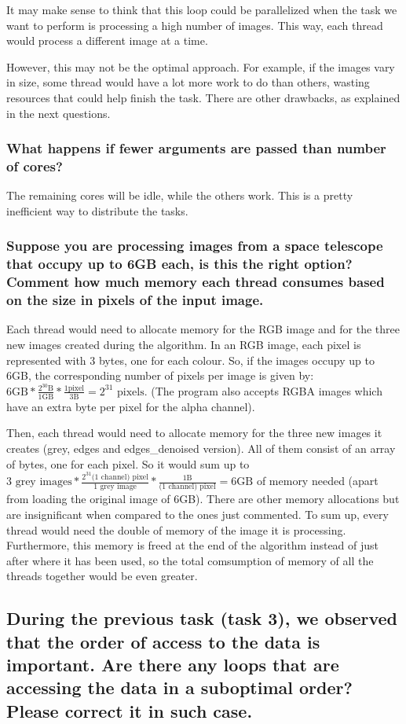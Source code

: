 \documentclass{article}
\newcommand{\question}[1]{\subsection{#1}}
\newcommand{\subquestion}[1]{\subsubsection{#1}}
\begin{document}
It may make sense to think that this loop could be parallelized when the task we want to perform is processing a high number of images. This way, each thread would process a different image at a time.

However, this may not be the optimal approach. For example, if the images vary in size, some thread would have a lot more work to do than others, wasting resources that could help finish the task. There are other drawbacks, as explained in the next questions.

    \subquestion{What happens if fewer arguments are passed than number of cores?}
            
    The remaining cores will be idle, while the others work. This is a pretty inefficient way to distribute the tasks.

    \subquestion{Suppose you are processing images from a space telescope that occupy up to 6GB each, is this the right option? Comment how much memory each thread consumes based on the size in pixels of the input image.}

    Each thread would need to allocate memory for the RGB image and for the three new images created during the algorithm. In an RGB image, each pixel is represented with 3 bytes, one for each colour. So, if the images occupy up to 6GB, the corresponding number of pixels per image is given by: ${6\text{GB}}*\frac{2^{30}\text{B}}{1\text{GB}}*\frac{1\text{pixel}}{3\text{B}}=2^{31}\text{ pixels}$. (The program also accepts RGBA images which have an extra byte per pixel for the alpha channel).
        
    Then, each thread would need to allocate memory for the three new images it creates (grey, edges and edges\_denoised version). All of them consist of an array of bytes, one for each pixel. So it would sum up to $3\text{ grey images}*\frac{2^{31}\text{(1 channel) pixel}}{\text{1 grey image}}*\frac{1\text{B}}{\text{(1 channel) pixel}}= 6 \text{GB}$ of memory needed (apart from loading the original image of 6GB). There are other memory allocations but are insignificant when compared to the ones just commented. To sum up, every thread would need the double of memory of the image it is processing. Furthermore, this memory is freed at the end of the algorithm instead of just after where it has been used, so the total comsumption of memory of all the threads together would be even greater.


\question{During the previous task (task 3), we observed that the order of access to the data is important. Are there any loops that are accessing the data in a suboptimal order? Please correct it in such case.}
\end{document}
